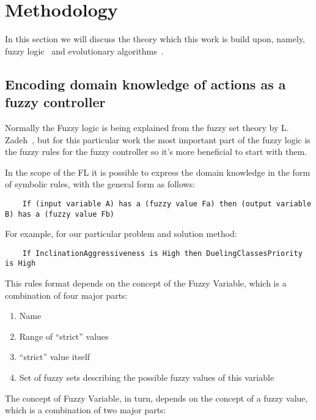 \documentclass[11pt, a4paper]{article}
\begin{document}
	\section{Methodology}\label{methodology}

  In this section we will discuss the theory which this work is build upon, namely, fuzzy logic~\cite{ray2014softcomputing} and evolutionary algorithms~\cite{mitchell1999geneticalgorithms}.

	\subsection{Encoding domain knowledge of actions as a fuzzy controller}

  Normally the Fuzzy logic is being explained from the fuzzy set theory by L. Zadeh~\cite{zadehFSbase}, but for this particular work the most important part of the fuzzy logic is the fuzzy rules for the fuzzy controller so it's more beneficial to start with them.

  In the scope of the FL it is possible to express the domain knowledge in the form of symbolic rules, with the general form as follows:

  \begin{verbatim}
    If (input variable A) has a (fuzzy value Fa) then (output variable B) has a (fuzzy value Fb)
  \end{verbatim}

  For example, for our particular problem and solution method:

  \begin{verbatim}
    If InclinationAggressiveness is High then DuelingClassesPriority is High
  \end{verbatim}

  This rules format depends on the concept of the Fuzzy Variable, which is a combination of four major parts:

  \begin{enumerate}
    \item Name
    \item Range of ``strict'' values
    \item ``strict'' value itself
    \item Set of fuzzy sets describing the possible fuzzy values of this variable
  \end{enumerate}

  The concept of Fuzzy Variable, in turn, depends on the concept of a fuzzy value, which is a combination of two major parts:
\end{document}
